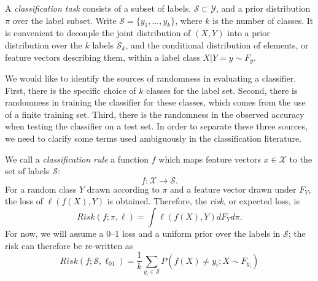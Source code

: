 \documentclass[12pt]{article}
\begin{document}




A \emph{classification task} consists of a subset of labels,
$\mathcal{S} \subset \mathcal{Y}$, and a prior distribution $\pi$ over
the label subset. Write $\mathcal{S}=\{y_1,\hdots, y_k\}$, where $k$
is the number of classes.  It is convenient to decouple the joint distribution of $(X,Y)$ into a prior distribution over the $k$ labels $\mathcal{S}_k$, and the conditional distribution of elements, or feature vectors describing them, within a label class $X|Y=y \sim F_y$.

We would like to identify the sources of randomness in evaluating a classifier. 
First, there is the specific choice of $k$ classes for the label set. Second, there is randomness in training the classifier for these classes, which comes from the use of a finite training set. Third, there is the randomness in the observed accuracy when testing the classifier on a test set. In order to separate these three sources, we need to clarify some terms used ambiguously in the classification literature. 

We call a \emph{classification rule} a
function $f$ which maps feature vectors
$x \in \mathcal{X}$ to the set of labels $\mathcal{S}$:
\[
f: \mathcal{X} \to \mathcal{S}.
\]
For a random class $Y$ drawn according to $\pi$ 
and a feature vector drawn under $F_Y$, the loss of $\ell(f(X),Y)$ is obtained.
Therefore, the \emph{risk}, or expected loss, is 
\[Risk(f;\pi,\ell) = \int \ell(f(X),Y)dF_Y d\pi .\]
For now, we will assume a 0--1 loss and a uniform prior over the labels in $\mathcal{S}$; the risk can therefore be re-written as
\[Risk(f;\mathcal{S},\ell_{01}) = \frac{1}{k}\sum_{y_i\in \mathcal{S}}P(f(X)\neq y_i ; X\sim F_{y_i} )   \]
\end{document}

